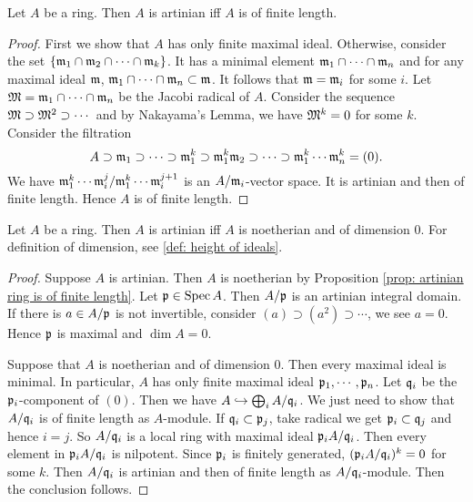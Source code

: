         \begin{proposition}\label{prop: artinian ring is of finite length}
            Let $A$ be a ring. 
            Then $A$ is artinian iff $A$ is of finite length.
        \end{proposition}
        \begin{proof}
            First we show that $A$ has only finite maximal ideal.
            Otherwise, consider the set $\{{\mathfrak{m}}_1 \cap {\mathfrak{m}}_2 \cap \cdots \cap {\mathfrak{m}}_k\}$.
            It has a minimal element ${\mathfrak{m}}_1 \cap \cdots \cap {\mathfrak{m}}_n$ and for any maximal ideal ${\mathfrak{m}}$, ${\mathfrak{m}}_1 \cap \cdots \cap {\mathfrak{m}}_n \subset {\mathfrak{m}}$.
            It follows that ${\mathfrak{m}} = {\mathfrak{m}}_i$ for some $i$.
            Let ${\mathfrak{M}} = {\mathfrak{m}}_1 \cap \cdots \cap {\mathfrak{m}}_n$ be the Jacobi radical of $A$.
            Consider the sequence ${\mathfrak{M}} \supset {\mathfrak{M}}^2 \supset \cdots$ and by Nakayama's Lemma, we have ${\mathfrak{M}}^k = 0$ for some $k$.
            Consider the filtration 
            \[ A \supset {\mathfrak{m}}_1 \supset \cdots \supset {\mathfrak{m}}_1^k \supset {\mathfrak{m}}_1^k{\mathfrak{m}}_2 \supset \cdots \supset {\mathfrak{m}}_1^k \cdots {\mathfrak{m}}_n^k  = (0). \] 
            We have ${\mathfrak{m}}_1^k\cdots{\mathfrak{m}}_i^j/{\mathfrak{m}}_1^k\cdots{\mathfrak{m}}_i^{j+1}$ is an $A/{\mathfrak{m}}_i$-vector space.
            It is artinian and then of finite length.
            Hence $A$ is of finite length.
        \end{proof}
        
        \begin{proposition}\label{prop: artinian ring is of codimension 0}
            Let $A$ be a ring. 
            Then $A$ is artinian iff $A$ is noetherian and of dimension $0$.
            For definition of dimension, see \ref{def: height of ideals}.
        \end{proposition}
        \begin{proof}
            Suppose $A$ is artinian.
            Then $A$ is noetherian by Proposition \ref{prop: artinian ring is of finite length}.
            Let ${\mathfrak{p}} \in \operatorname{Spec} A$.
            Then $A/{\mathfrak{p}}$ is an artinian integral domain.
            If there is $a\in A/{\mathfrak{p}}$ is not invertible, consider $(a) \supset (a^2) \supset \cdots$, we see $a=0$.
            Hence ${\mathfrak{p}}$ is maximal and $\dim A = 0$. 

            Suppose that $A$ is noetherian and of dimension $0$.
            Then every maximal ideal is minimal.
            In particular, $A$ has only finite maximal ideal ${\mathfrak{p}}_1,\cdots,{\mathfrak{p}}_n$.
            Let ${\mathfrak{q}}_i$ be the ${\mathfrak{p}}_i$-component of $(0)$.
            Then we have $A \hookrightarrow \bigoplus_i A/{\mathfrak{q}}_i$.
            We just need to show that $A/{\mathfrak{q}}_i$ is of finite length as $A$-module.
            If ${\mathfrak{q}}_i \subset {\mathfrak{p}}_j$, take radical we get ${\mathfrak{p}}_i \subset {\mathfrak{q}}_j$ and hence $i=j$.
            So $A/{\mathfrak{q}}_i$ is a local ring with maximal ideal ${\mathfrak{p}}_i A/{\mathfrak{q}}_i$.
            Then every element in ${\mathfrak{p}}_i A/{\mathfrak{q}}_i$ is nilpotent.
            Since ${\mathfrak{p}}_i$ is finitely generated, $({\mathfrak{p}}_i A/{\mathfrak{q}}_i)^k = 0$ for some $k$.
            Then $A/{\mathfrak{q}}_i$ is artinian and then of finite length as $A/{\mathfrak{q}}_i$-module.
            Then the conclusion follows.
        \end{proof}